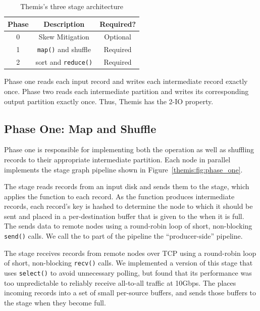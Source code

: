 \begin{table}
\centering
\caption{\label{tbl:stages} Themis's three stage architecture}
\begin{tabular}{|c|c|c|} \hline
\textbf{Phase} & \textbf{Description} & \textbf{Required?} \\\hline
0 & Skew Mitigation & Optional \\
1 & \texttt{map()} and shuffle & Required \\
2 & sort and \texttt{reduce()} & Required \\\hline
\end{tabular}
\end{table}

Phase one reads each input record and writes each intermediate record exactly
once.  Phase two reads each intermediate partition and writes its corresponding
output partition exactly once.  Thus, Themis has the 2-IO property.

\subsection{Phase One: Map and Shuffle}
\label{sec:phase_one}
\label{sec:map}

Phase one is responsible for implementing both the \map operation as well as
shuffling records to their appropriate intermediate partition.  Each node in
parallel implements the stage graph pipeline shown in
Figure~\ref{themis:fig:phase_one}.

The \Readerbf stage reads records from an input disk and sends them to the
\Mapperbf stage, which applies the \map function to each record.  As the \map
function produces intermediate records, each record's key is hashed to
determine the node to which it should be sent and placed in a
per-destination buffer that is given to the \sender when it is full.  The
\Senderbf sends data to remote nodes using a round-robin loop of short,
non-blocking \texttt{send()} calls.  We call the \Reader to \Sender part of the
pipeline the ``producer-side'' pipeline.

The \Receiverbf stage receives records from remote nodes over TCP using
a round-robin loop of short, non-blocking \texttt{recv()} calls. We implemented
a version of this stage that uses \texttt{select()} to avoid unnecessary
polling, but found that its performance was too unpredictable to reliably
receive all-to-all traffic at 10Gbps. The \receiver places incoming records
into a set of small per-source buffers, and sends those buffers to
the \Demux stage when they become full.

